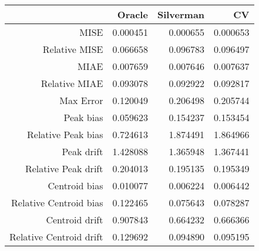 \begin{tabular}{rrrr}
  \hline
 & Oracle & Silverman & CV \\ 
  \hline
MISE & 0.000451 & 0.000655 & 0.000653 \\ 
  Relative MISE & 0.066658 & 0.096783 & 0.096497 \\ 
  MIAE & 0.007659 & 0.007646 & 0.007637 \\ 
  Relative MIAE & 0.093078 & 0.092922 & 0.092817 \\ 
  Max Error & 0.120049 & 0.206498 & 0.205744 \\ 
  Peak bias & 0.059623 & 0.154237 & 0.153454 \\ 
  Relative Peak bias & 0.724613 & 1.874491 & 1.864966 \\ 
  Peak drift & 1.428088 & 1.365948 & 1.367441 \\ 
  Relative Peak drift & 0.204013 & 0.195135 & 0.195349 \\ 
  Centroid bias & 0.010077 & 0.006224 & 0.006442 \\ 
  Relative Centroid bias & 0.122465 & 0.075643 & 0.078287 \\ 
  Centroid drift & 0.907843 & 0.664232 & 0.666366 \\ 
  Relative Centroid drift & 0.129692 & 0.094890 & 0.095195 \\ 
   \hline
\end{tabular}
